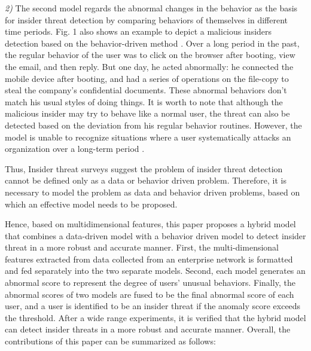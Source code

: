 \documentclass[conference]{IEEEtran}
\begin{document}
\noindent \emph{2)} The second model regards the abnormal changes in the behavior as the basis for insider threat detection by comparing behaviors of themselves in different time periods.
Fig. 1 also shows an example to depict a malicious insiders detection based on the behavior-driven method \cite{b8}. Over a long period in the past, the regular behavior of the user was to click on the browser after booting, view the email, and then reply. But one day, he acted abnormally: he connected the mobile device after booting, and had a series of operations on the file-copy to steal the company's confidential documents. These abnormal behaviors don't match his usual styles of doing things. It is worth to note that although the malicious insider may try to behave like a normal user, the threat can also be detected based on the deviation from his regular behavior routines.
However, the model is unable to recognize situations where a user systematically attacks an
organization over a long-term period \cite{b3}. 

Thus, Insider threat surveys \cite{b9} suggest the problem of insider threat detection cannot be defined only as a data or behavior driven problem. Therefore, it is necessary to model the problem as data and behavior driven problems, based on which an effective model needs to be proposed.

Hence, based on multidimensional features, this paper proposes a hybrid model that combines a data-driven model with a behavior driven model to detect insider threat in a more robust and accurate manner.
First, the multi-dimensional features extracted from data collected from an enterprise network is formatted and fed separately into the two separate models. Second, each model generates an abnormal score to represent the degree of users' unusual behaviors. Finally, the abnormal scores of two models are fused to be the final abnormal score of each user, and a user is identified to be an insider threat if the anomaly score exceeds the threshold. 
After a wide range experiments, it is 
verified that the hybrid model can detect insider threats in a more robust and accurate manner.
Overall, the contributions of this paper can be summarized as follows:
\end{document}
